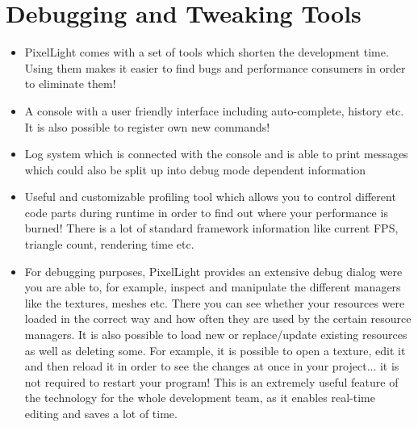\section{Debugging and Tweaking Tools}
\begin{itemize}
\item{PixelLight comes with a set of tools which shorten the development time. Using them makes it easier to find bugs and performance consumers in order to eliminate them!}
\item{A console with a user friendly interface including auto-complete, history etc. It is also possible to register own new commands!}
\item{Log system which is connected with the console and is able to print messages which could also be split up into debug mode dependent information}
\item{Useful and customizable profiling tool which allows you to control different code parts during runtime in order to find out where your performance is burned! There is a lot of standard framework information like current \ac{FPS}, triangle count, rendering time etc.}
\item{For debugging purposes, PixelLight provides an extensive debug dialog were you are able to, for example, inspect and manipulate the different managers like the textures, meshes etc. There you can see whether your resources were loaded in the correct way and how often they are used by the certain resource managers. It is also possible to load new or replace/update existing resources as well as deleting some. For example, it is possible to open a texture, edit it and then reload it in order to see the changes at once in your project... it is not required to restart your program! This is an extremely useful feature of the technology for the whole development team, as it enables real-time editing and saves a lot of time.}
\end{itemize}
\newpage
